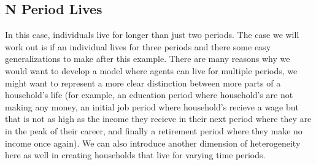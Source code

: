 \documentclass[11pt,english]{article}
\begin{document}
\subsection*{N Period Lives}

\noindent In this case, individuals live for longer than just two periods. The case we will work out is if an individual lives for three periods and there some easy generalizations to make after this example. There are many reasons why we would want to develop a model where agents can live for multiple periods, we might want to represent a more clear distinction between more parts of a household's life (for example, an education period where household's are not making any money, an initial job period where household's recieve a wage but that is not as high as the income they recieve in their next period where they are in the peak of their career, and finally a retirement period where they make no income once again). We can also introduce another dimension of heterogeneity here as well in creating households that live for varying time periods. \\
\end{document}
